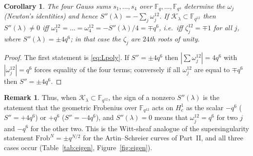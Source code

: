 ﻿\documentclass[12pt,a4paper]{amsart}
\newtheorem{corollary}[theorem]{Corollary}
\theoremstyle{definition}
\newtheorem{remark}[theorem]{Remark}
\newcommand{\F}{\mathbb{F}}
\newcommand{\Kk}{\mathcal{K}}
\newcommand{\Spp}{S''}
\begin{document}
\begin{corollary}\label{cor:Lprinciple}
The four Gauss sums $s_1,\dots,s_4$ over $\F_q,\dots,\F_{q^4}$ determine the $\omega_j$ (Newton's identities) and hence $\Spp(\lambda)=-\sum_j\omega_j^{12}$. If $\Kk_\lambda\subset\F_{q^{12}}$ then $\Spp(\lambda)\ne0$ iff $\omega_1^{12}=\dots=\omega_4^{12}=-\Spp(\lambda)/4=\mp q^6$, i.e.\ iff $\zeta_j^{12}=\mp1$ for all $j$, where $\Spp(\lambda)=\pm4q^6$; in that case the $\zeta_j$ are $24$th roots of unity.
\end{corollary}
\begin{proof}
The first statement is \eqref{eq:Lpoly}. If $\Spp=\pm4q^6$ then $|\sum\omega_j^{12}|=4q^6$ with $|\omega_j^{12}|=q^6$ forces equality of the four terms; conversely if all $\omega_j^{12}$ are equal to $\mp q^6$ then $\Spp=\pm4q^6$.
\end{proof}

\begin{remark}
Thus, when $\Kk_\lambda\subset\F_{q^{12}}$, the sign of a nonzero $\Spp(\lambda)$ is the statement that the geometric Frobenius over $\F_{q^{12}}$ acts on $H^1_c$ as the scalar $-q^6$ ($\Spp=+4q^6$) or $+q^6$ ($\Spp=-4q^6$), and $\Spp(\lambda)=0$ means that $\omega_j^{12}=q^6$ for two $j$ and $-q^6$ for the other two. This is the Witt-sheaf analogue of the supersingularity statement $\mathrm{Frob}^{N}=\pm q^{N/2}$ for the Artin--Schreier curves of Part~II, and all three cases occur (Table~\ref{tab:eigen}, Figure~\ref{fig:eigen}).
\end{remark}
\end{document}
